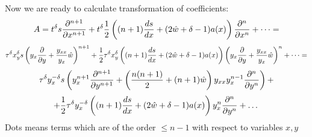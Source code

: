            Now we are ready to calculate transformation of coefficients:
                  $$
                  A=t^\delta
    s{\partial ^{n+1}\over \partial x^{n+1}}
        +t^\delta{1\over 2}
        \left(
        (n+1){ds\over dx}+
        (2\hat w+\delta-1)a(x)
               \right) {\partial^{n}\over \partial x^{n}}+
            \dots=
                  $$
                  $$
                  \tau^\delta x_y^\delta
                           s
    \left(y_x {\partial\over \partial y}+{y_{xx}\over y_x}\hat w\right)^{n+1}
        +{1\over 2}
        \tau^\delta x_y^\delta
        \left(
        (n+1){ds\over dx}+
        (2\hat w+\delta-1)a(x)
               \right) \left(y_x {\partial\over \partial y}+{y_{xx}\over y_x}\hat w\right)^n+
            \dots=
                  $$
                  $$
                 \tau^\delta y_x^{-\delta}
                           s
                          \left(
                          y_x^{n+1}{\partial ^{n+1}\over \partial y^{n+1}}+
                          \left({n(n+1)\over 2}+(n+1)\hat w\right)y_{xx}y^{n-1}_x
                          {\partial ^{n}\over \partial y^{n}}
                          \right)
        +
        $$
        $$
        +{1\over 2}
        \tau^\delta y_x^{-\delta}
        \left(
        (n+1){ds\over dx}+
        (2\hat w+\delta-1)a(x)
               \right)
               y^n_x {\partial^n\over \partial y^n}+
            \dots
                  $$
Dots means terms which are of the order $\leq n-1$ with respect to variables $x,y$

